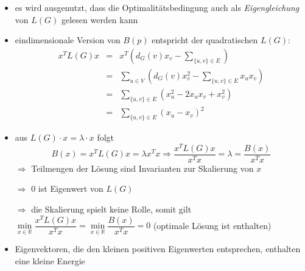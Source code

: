 \vspace*{-0.25\baselineskip}
\begin{itemize}[itemsep=-2pt]
	\item es wird ausgenutzt, dass die Optimalitätsbedingung auch als \textit{Eigengleichung} von $L(G)$ gelesen werden kann
	\item eindimensionale Version von $B(p)$ entspricht der quadratischen $L(G)$:
		\begin{eqnarray*}
			x^TL(G)x&=&x^T\left(d_G(v)x_v-\sum\limits_{\{u,v\}\in E}\right)\\
			&=&\sum\limits_{u\in V}\left(d_G(v)x_v^2-\sum\limits_{\{u,v\}\in E}x_ux_v\right)\\
			&=&\sum\limits_{\{u,v\}\in E}\left(x_u^2-2x_ux_v+x_v^2\right)\\
			&=&\sum\limits_{\{u,v\}\in E}\left(x_u-x_v\right)^2
		\end{eqnarray*}
	\item aus $L(G)\cdot x=\lambda\cdot x$ folgt
	\vspace*{-0.25\baselineskip}
		\[B(x)=x^TL(G)x=\lambda x^Tx\Rightarrow \dfrac{x^TL(G)x}{x^Tx}=\lambda=\dfrac{B(x)}{x^Tx}\]
	$\Rightarrow$ Teilmengen der Lösung sind Invarianten zur Skalierung von $x$
	\item[$\Rightarrow$] $0$ ist Eigenwert von $L(G)$
	\item[$\Rightarrow$] die Skalierung spielt keine Rolle, somit gilt $\min\limits_{x\in \mathbb{R}}\dfrac{x^TL(G)x}{x^Tx}=\min\limits_{x\in \mathbb{R}}\dfrac{B(x)}{x^Tx}=0$ (optimale Lösung ist enthalten)
	\item Eigenvektoren, die den kleinen positiven Eigenwerten entsprechen, enthalten eine kleine Energie
\end{itemize}
\topbreak
\vspace*{-2\baselineskip}

